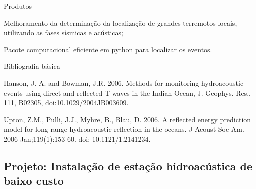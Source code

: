 \documentclass[10pt,a4paper,oneside]{book}
\begin{document}
\begin{fancyenum}{\faShoppingCart}{Produtos}
	\item Melhoramento da determinação da localização de grandes terremotos locais, utilizando as fases sísmicas e acústicas;
	\item Pacote computacional eficiente em python para localizar os eventos.
\end{fancyenum}

\begin{fancyenum}{\faBook}{Bibliografia básica}
	\item Hanson, J. A. and Bowman, J.R.  2006. Methods for monitoring hydroacoustic events using direct and reflected T waves in the Indian Ocean, J. Geophys. Res., 111, B02305, doi:10.1029/2004JB003609.
	\item Upton, Z.M., Pulli, J.J., Myhre, B., Blau, D. 2006. A reflected energy prediction model for long-range hydroacoustic reflection in the oceans. J Acoust Soc Am. 2006 Jan;119(1):153-60. doi: 10.1121/1.2141234.
\end{fancyenum}

\subsection{Projeto: Instalação de estação hidroacústica de baixo custo}
\end{document}

